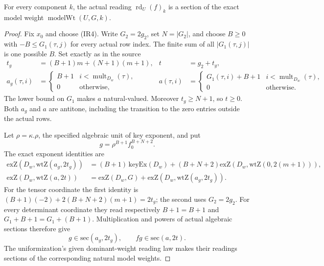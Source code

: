 \begin{srproposition}\label{prop:sr-source-integer-reading}
For every component \(k\), the actual reading
\(\operatorname{rd}_U(f)_k\) is a section of the exact model weight
\(\operatorname{modelWt}(U,G,k)\).
\end{srproposition}
\begin{proof}
Fix \(x_0\) and choose (IR4).
Write \(G_2=2g_2\), set \(N=|G_2|\), and choose \(B\ge0\) with
\(-B\le G_1(\tau,j)\) for every actual row index.
The finite sum of all \(|G_1(\tau,j)|\) is one possible \(B\).
Set exactly as in the source
\[
 \begin{aligned}
 t_g&=(B+1)m+(N+1)(m+1),&t&=g_2+t_g,\\
 a_g(\tau,i)&=
 \begin{cases}B+1&i<\operatorname{mult}_{D_w}(\tau),\\0&\text{otherwise},
 \end{cases}&
 a(\tau,i)&=
 \begin{cases}G_1(\tau,i)+B+1&i<\operatorname{mult}_{D_w}(\tau),\\
 0&\text{otherwise}.
 \end{cases}
 \end{aligned}
 \tag{IR5}\label{eq:sr-source-integer-clearing}
\]
The lower bound on \(G_1\) makes \(a\) natural-valued.
Moreover \(t_g\ge N+1\), so \(t\ge0\).
Both \(a_g\) and \(a\) are antitone, including the transition
to the zero entries outside the actual rows.

Let \(\rho=\kappa.\rho\), the specified algebraic unit of key
exponent, and put
\[
                  g=\rho^{B+1}f_0^{B+N+2}.
 \tag{IR6}\label{eq:sr-source-reading-clearing-section}
\]
The exact exponent identities are
\[
 \begin{split}
 \mathrm{exZ}(D_w,\mathrm{wtZ}(a_g,2t_g))
  &=(B+1)\,\mathrm{keyEx}(D_w)
      +(B+N+2)\mathrm{exZ}(D_w,\mathrm{wtZ}(0,2(m+1))),\\
 \mathrm{exZ}(D_w,\mathrm{wtZ}(a,2t))
  &=\mathrm{exZ}(D_w,G)
       +\mathrm{exZ}(D_w,\mathrm{wtZ}(a_g,2t_g)).
 \end{split}
 \tag{IR7}\label{eq:sr-source-reading-exponent-identities}
\]
For the tensor coordinate the first identity is
\((B+1)(-2)+2(B+N+2)(m+1)=2t_g\);
the second uses \(G_2=2g_2\).
For every determinant coordinate they read respectively
\(B+1=B+1\) and
\(G_1+B+1=G_1+(B+1)\).
Multiplication and powers of actual algebraic sections therefore give
\[
       g\in\mathrm{sec}(a_g,2t_g),\qquad
       fg\in\mathrm{sec}(a,2t).
\]
The uniformization's given dominant-weight reading law makes their
readings sections of the corresponding natural model weights.


\end{proof}
